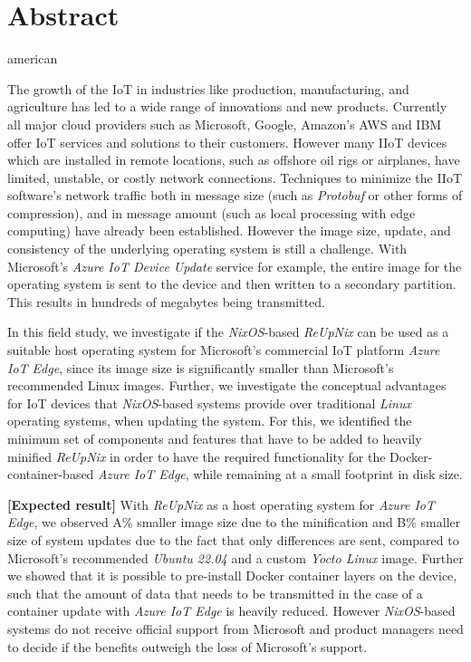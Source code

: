 \chapter*{Abstract}
\begin{otherlanguage*}{american}

The growth of the \ac{IoT} in industries like production, manufacturing, and
agriculture has led to a wide range of innovations and new products. Currently
all major cloud providers such as Microsoft, Google, Amazon's AWS and IBM offer
\ac{IoT} services and solutions to their customers. However many \ac{IIoT} devices
which are installed in remote locations, such as offshore oil rigs or airplanes,
have limited, unstable, or costly network connections. Techniques to
minimize the \ac{IIoT} software’s network traffic both in message size
(such as \textit{Protobuf} or other forms of compression), and in message amount
(such as local processing with edge computing) have already been established.
However the image size, update, and consistency of the underlying operating
system is still a challenge. With Microsoft's \textit{Azure IoT Device
Update} service for example, the entire image for the operating system is sent
to the device and then written to a secondary partition. This results in hundreds
of megabytes being transmitted.

In this field study, we investigate if the \textit{NixOS}-based \textit{ReUpNix}
can be used as a suitable host operating system for Microsoft’s commercial
\ac{IoT} platform \textit{Azure IoT Edge}, since its image size is significantly
smaller than Microsoft's recommended Linux images.
Further, we investigate the conceptual advantages for \ac{IoT}
devices that \textit{NixOS}-based systems provide over traditional \textit{Linux}
operating systems, when updating the system. For this, we identified the
minimum set of components and features that have to be added to heavily minified
\textit{ReUpNix} in order to have the required functionality for the
Docker-container-based \textit{Azure IoT Edge}, while remaining at a small
footprint in disk size.

\textbf{[Expected result]}
With \textit{ReUpNix} as a host operating system for \textit{Azure IoT Edge}, we
observed A\% smaller image size due to the minification and B\% smaller size of
system updates due to the fact that only differences are sent, compared to
Microsoft's recommended \textit{Ubuntu 22.04} and a custom \textit{Yocto Linux}
image. Further we showed that it is possible to pre-install Docker container
layers on the device, such that the amount of data that needs to be transmitted
in the case of a container update with \textit{Azure IoT Edge} is heavily reduced.
However \textit{NixOS}-based systems do not receive official support from
Microsoft and product managers need to decide if the benefits outweigh the loss
of Microsoft's support.



\end{otherlanguage*}
